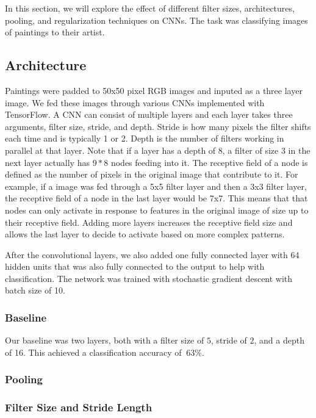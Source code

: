 \documentclass[10pt,twoside]{article}
\begin{document}
In this section, we will explore the effect of different filter sizes, architectures, pooling, and regularization techniques on CNNs. The task was classifying images of paintings to their artist.

\subsection{Architecture}

\noindent Paintings were padded to 50x50 pixel RGB images and inputed as a three layer image. We fed these images through various CNNs implemented with TensorFlow. A CNN can consist of multiple layers and each layer takes three arguments, filter size, stride, and depth. Stride is how many pixels the filter shifts each time and is typically 1 or 2. Depth is the number of filters working in parallel at that layer. Note that if a layer has a depth of 8, a filter of size 3 in the next layer actually has $9*8$ nodes feeding into it. The receptive field of a node is defined as the number of pixels in the original image that contribute to it. For example, if a image was fed through a 5x5 filter layer and then a 3x3 filter layer, the receptive field of a node in the last layer would be 7x7. This means that that nodes can only activate in response to features in the original image of size up to their receptive field. Adding more layers increases the receptive field size and allows the last layer to decide to activate based on more complex patterns.

After the convolutional layers, we also added one fully connected layer with 64 hidden units that was also fully connected to the output to help with classification. The network was trained with stochastic gradient descent with batch size of 10.

\subsubsection{Baseline}
 Our baseline was two layers, both with a filter size of $5$, stride of $2$, and a depth of 16. This achieved a classification accuracy of $~63\%$. 

\subsubsection{Pooling}

\subsubsection{Filter Size and Stride Length}
\end{document}
